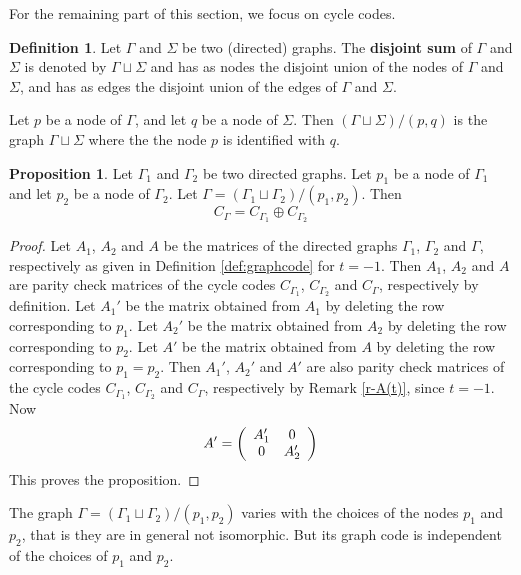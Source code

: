 \documentclass[11pt,a4paper]{article}
\theoremstyle{definition}
\newtheorem{proposition}[theorem]{Proposition}
\newtheorem{definition}[theorem]{Definition}
\begin{document}
For the remaining part of this section, we focus on cycle codes.


\begin{definition}\label{d-sum-graph}
Let $\Gamma$ and $\Sigma$ be two (directed) graphs.
The \textbf{disjoint sum} of $\Gamma$ and $\Sigma$ is denoted by $\Gamma \sqcup\Sigma$
and has as nodes the disjoint union of the nodes of $\Gamma$ and $\Sigma$, 
and has as edges the disjoint union of the edges of $\Gamma$ and $\Sigma$.

Let $p$ be a node of $\Gamma$, 
and let $q$ be a node of $\Sigma$.
Then $(\Gamma \sqcup\Sigma )/ (p,q)$ is the graph
$\Gamma \sqcup\Sigma$ where the the node $p$ is identified with $q$.
\end{definition}

\begin{proposition}\label{p-sum-code-graph-pol}
Let $\Gamma_1$ and $\Gamma_2$ be two directed graphs. Let $p_1$ be a node of $\Gamma_1 $ and let $p_2$ be a node of $\Gamma_2 $.
Let $\Gamma =(\Gamma_1 \sqcup \Gamma_2 )/ (p_1,p_2)$.
Then 
$$
C_{\Gamma}=C_{\Gamma_1} \oplus C_{\Gamma_2}
$$  
\end{proposition}
\begin{proof}
Let $A_1$, $A_2$ and $A$ be the matrices of the directed graphs $\Gamma_1$,  $\Gamma_2$ and $\Gamma$, respectively as given in 
Definition \ref{def:graphcode} for $t=-1$. Then $A_1$, $A_2$ and $A$ are parity check matrices of the cycle codes 
 $C_{\Gamma_1}$, $ C_{\Gamma_2}$ and $C_{\Gamma}$, respectively by definition.
Let $A_1'$ be the matrix obtained from $A_1$ by deleting the row corresponding to $p_1$.
Let $A_2'$ be the matrix obtained from $A_2$ by deleting the row corresponding to $p_2$.
Let $A'$ be the matrix obtained from $A$ by deleting the row corresponding to $p_1=p_2$.
Then $A_1'$, $A_2'$ and $A'$ are also parity check matrices of the cycle codes 
$C_{\Gamma_1}$, $ C_{\Gamma_2}$ and $C_{\Gamma}$, respectively by Remark \ref{r-A(t)}, since $t=-1$. 
Now 
 $$
 A'=
 \left(
\begin{array}{c c}
 A_1' & 0 \\
 0    & A_2' \\
 \end{array}
 \right)
 $$
This proves the proposition.
\end{proof}

The graph $\Gamma =(\Gamma_1 \sqcup \Gamma_2 )/ (p_1,p_2)$ varies with the choices of the nodes $p_1$ and $p_2$, that is they are in general not isomorphic. But its graph code is independent of the choices of $p_1$ and $p_2$. 
\end{document}
